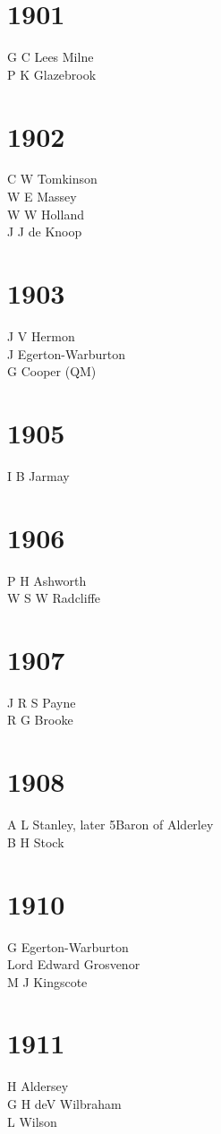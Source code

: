 \begin{multicols}{2}
  \section*{1901}
  G C Lees Milne \\
  P K Glazebrook \\
  \section*{1902}
  C W Tomkinson \\
  W E Massey \\
  W W Holland \\
  J J de Knoop \\
  \section*{1903}
  J V Hermon \\
  J Egerton-Warburton \\
  G Cooper (QM) \\
  \section*{1905}
  I B Jarmay \\
  \section*{1906}
  P H Ashworth \\
  W S W Radcliffe \\
  \section*{1907}
  J R S Payne \\
  R G Brooke \\
  \section*{1908}
  A L Stanley, later 5\nth Baron of Alderley \\
  B H Stock \\
  \section*{1910}
  G Egerton-Warburton \\
  Lord Edward Grosvenor \\
  M J Kingscote \\
  \section*{1911}
  H Aldersey \\
  G H deV Wilbraham \\
  L Wilson \\

\end{multicols}
